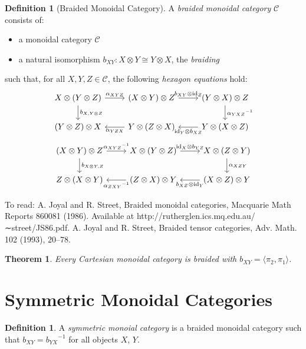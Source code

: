 \documentclass{book}
\newtheorem{thm}[lm]{Theorem}
\theoremstyle{definition}
\newtheorem{df}[lm]{Definition}
\newcommand{\id}[1]{\ensuremath{\mathrm{id}_{#1}}}
\newcommand{\inv}[1]{\ensuremath{{#1}^{-1}}}
\begin{document}
  \begin{df}[Braided Monoidal Category]
    A \emph{braided monoidal category} $\mathcal{C}$ consists of:
    \begin{itemize}
      \item a monoidal category $\mathcal{C}$
      \item a natural isomorphism $b_{XY} : X \otimes Y \cong Y \otimes X$, the 
      \emph{braiding}
    \end{itemize}
    such that, for all $X, Y, Z \in \mathcal{C}$, the following \emph{hexagon 
      equations} hold:
    \[ \begin{tikzcd}
      X \otimes (Y \otimes Z) \ar[r, "\alpha_{XYZ}"] \ar[d, "b_{X,Y \otimes Z}"] 
      &
      (X \otimes Y) \otimes Z \ar[r, "b_{XY} \otimes \id{Z}"] &
      (Y \otimes X) \otimes Z \ar[d, "\inv{\alpha_{YXZ}}"] \\
      (Y \otimes Z) \otimes X &
      Y \otimes (Z \otimes X) \ar[l, "\alpha_{YZX}"] &
      Y \otimes (X \otimes Z) \ar[l, "\id{Y} \otimes b_{XZ}"]
    \end{tikzcd} \]
    \[ \begin{tikzcd}
      (X \otimes Y) \otimes Z \ar[r, "\inv{\alpha_{XYZ}}"] \ar[d, "b_{X 
        \otimes Y, Z}"] &
      X \otimes (Y \otimes Z) \ar[r, "\id{X} \otimes b_{YZ}"] &
      X \otimes (Z \otimes Y) \ar[d, "\alpha_{XZY}"] \\
      Z \otimes (X \otimes Y) &
      (Z \otimes X) \otimes Y \ar[l, "\inv{\alpha_{ZXY}}"] &
      (X \otimes Z) \otimes Y \ar[l, "b_{XZ} \otimes \id{Y}"]
    \end{tikzcd} \]
  \end{df}
  
  To read: A. Joyal and R. Street, Braided monoidal categories, Macquarie Math 
  Reports 860081 (1986). Available
  at http://rutherglen.ics.mq.edu.au/∼street/JS86.pdf.
  A. Joyal and R. Street, Braided tensor categories, Adv. Math. 102 (1993), 
  20–78.
  
  \begin{thm}
    Every Cartesian monoidal category is braided with $b_{XY} = \langle \pi_2, 
    \pi_1 \rangle$.
  \end{thm}
  
  \section{Symmetric Monoidal Categories}
  
  \begin{df}
    A \emph{symmetric monoial category} is a braided monoidal category such 
    that 
    $b_{XY} = \inv{b_{YX}}$ for all objects $X$, $Y$.
  \end{df}
  
\end{document}
